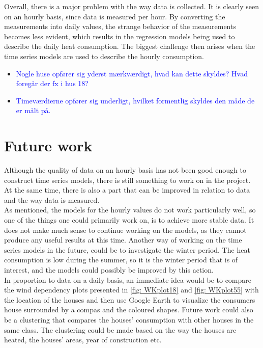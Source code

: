 \noindent Overall, there is a major problem with the way data is collected. It is clearly seen on an hourly basis, since data is measured per hour. By converting the measurements into daily values, the strange behavior of the measurements becomes less evident, which results in the regression models being used to describe the daily heat consumption. The biggest challenge then arises when the time series models are used to describe the hourly consumption.


\begin{itemize}
    \item \textcolor{blue}{Nogle huse opfører sig yderst mærkværdigt, hvad kan dette skyldes? Hvad foregår der fx i hus 18?}
    \item \textcolor{blue}{Timeværdierne opfører sig underligt, hvilket formentlig skyldes den måde de er målt på.} 
\end{itemize}

\section{Future work}
Although the quality of data on an hourly basis has not been good enough to construct time series models, there is still something to work on in the project. At the same time, there is also a part that can be improved in relation to data and the way data is measured. \\

\noindent As mentioned, the models for the hourly values do not ​​work particularly well, so one of the things one could primarily work on, is to achieve more stable data. It does not make much sense to continue working on the models, as they cannot produce any useful results at this time. Another way of working on the time series models in the future, could be to investigate the winter period. The heat consumption is low during the summer, so it is the winter period that is of interest, and the models could possibly be improved by this action. \\

\noindent In proportion to data on a daily basis, an immediate idea would be to compare the wind dependency plots presented in \cref{fig: WKplot18} and \cref{fig: WKplot55} with the location of the houses and then use Google Earth to visualize the consumers house surrounded by a compas and the coloured shapes. Future work could also be a clustering that compares the houses' consumption with other houses in the same class. The clustering could be made based on the way the houses are heated, the houses' areas, year of construction etc.

